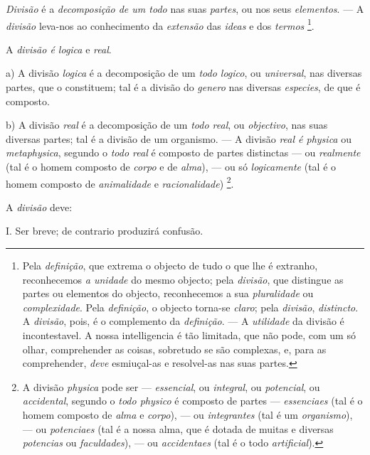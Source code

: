 
  
\emph{Divisão} é a \emph{decomposição de um todo} nas suas \emph{partes}, ou nos seus \emph{elementos}. --- A \emph{divisão} leva-nos ao conhecimento da \emph{extensão} das \emph{ideas} e dos \emph{termos} \footnote{Pela \emph{definição}, que extrema o objecto de tudo o que lhe é extranho, reconhecemos \emph{a unidade} do mesmo objecto; pela \emph{divisão}, que distingue as partes ou elementos do objecto, reconhecemos a sua \emph{pluralidade} ou \emph{complexidade}. Pela \emph{definição}, o objecto torna-se \emph{claro}; pela \emph{divisão}, \emph{distincto}. A \emph{divisão}, pois, é o complemento da \emph{definição}. --- A \emph{utilidade} da divisão é incontestavel. A nossa intelligencia é tão limitada, que não pode, com um só olhar, comprehender as coisas, sobretudo se são complexas, e, para as comprehender, \emph{deve} esmiuçal-as e resolvel-as nas suas partes.}.


A \emph{divisão é logica} e \emph{real}.

a) A divisão \emph{logica} é a decomposição de um \emph{todo logico}, ou \emph{universal}, nas diversas partes, que o constituem; tal é a divisão do \emph{genero} nas diversas \emph{especies}, de que é composto.

b) A divisão \emph{real} é a decomposição de um \emph{todo real}, ou \emph{objectivo}, nas suas diversas partes; tal é a divisão de um organismo. --- A divisão \emph{real é physica} ou \emph{metaphysica}, segundo o \emph{todo real} é composto de partes distinctas --- ou \emph{realmente} (tal é   o homem composto de \emph{corpo} e de \emph{alma}), --- ou só \emph{logicamente} (tal é o homem composto de \emph{animalidade} e \emph{racionalidade}) \footnote{A divisão \emph{physica} pode ser --- \emph{essencial}, ou \emph{integral}, ou \emph{potencial}, ou \emph{accidental}, segundo o \emph{todo physico} é composto de partes --- \emph{essenciaes} (tal é o homem composto de \emph{alma} e \emph{corpo}), --- ou \emph{integrantes} (tal é um \emph{organismo}), --- ou \emph{potenciaes} (tal é a nossa alma, que é dotada de muitas e diversas \emph{potencias} ou \emph{faculdades}), --- ou \emph{accidentaes} (tal é o todo \emph{artificial}).}.


A \emph{divisão} deve:

I. Ser breve; de contrario produzirá confusão.

